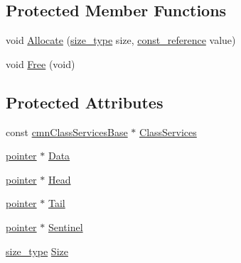 \subsection*{Protected Member Functions}
\begin{DoxyCompactItemize}
\item 
void \hyperlink{classmts_queue_generic_a0b52e7ce7da384217e55aac6dbb9ccbb}{Allocate} (\hyperlink{classmts_queue_generic_a3812ba15591f4a89a9df272391739e6f}{size\-\_\-type} size, \hyperlink{classmts_queue_generic_ad133c14265ada42f3347b90ccdd28cd3}{const\-\_\-reference} value)
\item 
void \hyperlink{classmts_queue_generic_a19094b93e750a951020dc0975bbe01af}{Free} (void)
\end{DoxyCompactItemize}
\subsection*{Protected Attributes}
\begin{DoxyCompactItemize}
\item 
const \hyperlink{classcmn_class_services_base}{cmn\-Class\-Services\-Base} $\ast$ \hyperlink{classmts_queue_generic_a321c0717536a770624f08d115035bd6d}{Class\-Services}
\item 
\hyperlink{classmts_queue_generic_aa3ad46661cfdf9f182fd9c32315930a5}{pointer} $\ast$ \hyperlink{classmts_queue_generic_a0507afc9cf7884640baff2df53ed93ea}{Data}
\item 
\hyperlink{classmts_queue_generic_aa3ad46661cfdf9f182fd9c32315930a5}{pointer} $\ast$ \hyperlink{classmts_queue_generic_aab4eea6a40fa92da11b717f656a0e115}{Head}
\item 
\hyperlink{classmts_queue_generic_aa3ad46661cfdf9f182fd9c32315930a5}{pointer} $\ast$ \hyperlink{classmts_queue_generic_a892964deb939b83138b69b9b852e1f7d}{Tail}
\item 
\hyperlink{classmts_queue_generic_aa3ad46661cfdf9f182fd9c32315930a5}{pointer} $\ast$ \hyperlink{classmts_queue_generic_af8b2c1f7982cd66fa6b48481bca7b029}{Sentinel}
\item 
\hyperlink{classmts_queue_generic_a3812ba15591f4a89a9df272391739e6f}{size\-\_\-type} \hyperlink{classmts_queue_generic_a5ac0990984482842ee9dcdf7e27e04ff}{Size}
\end{DoxyCompactItemize}


